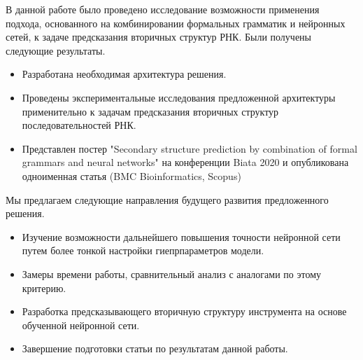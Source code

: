 В данной работе было проведено исследование возможности применения подхода, основанного на комбинировании формальных грамматик и нейронных сетей, к задаче предсказания вторичных структур РНК. Были получены следующие результаты.
\begin{itemize}
    \item Разработана необходимая архитектура решения.
    \item Проведены экспериментальные исследования предложенной архитектуры применительно к задачам предсказания вторичных структур последовательностей РНК.
    \item Представлен постер "Secondary structure prediction by combination
of formal grammars and neural networks" на конференции Biata 2020 и опубликована одноименная статья (BMC Bioinformatics, Scopus)
\end{itemize}

Мы предлагаем следующие направления будущего развития предложенного решения.
\begin{itemize}
    \item Изучение возможности дальнейшего повышения точности нейронной сети путем более тонкой настройки гиепрпараметров модели. 
    \item Замеры времени работы, сравнительный анализ с аналогами по этому критерию.
    \item Разработка предсказывающего вторичную структуру инструмента на основе обученной нейронной сети.
    \item Завершение подготовки статьи по результатам данной работы.
\end{itemize}